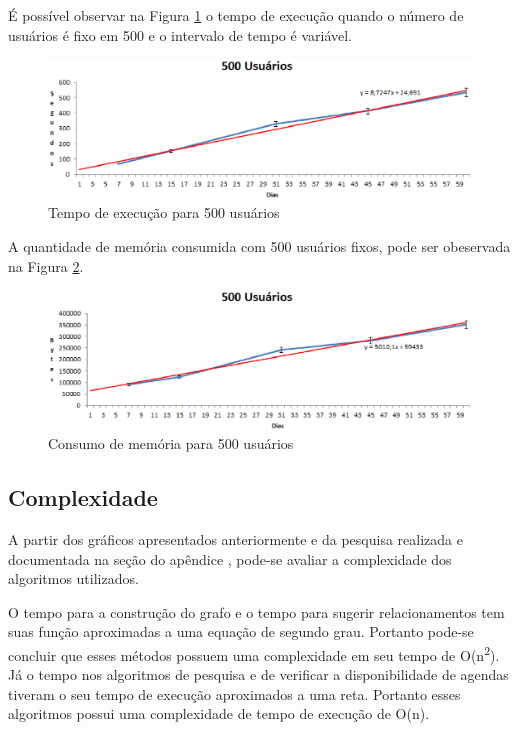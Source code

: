 
É possível observar na Figura \ref{500users_tempo} o tempo de execução quando o número de usuários é fixo em 500 e o intervalo de tempo é variável.

\begin{figure}[!h]
	\centering
	\includegraphics[scale=0.8]{figuras/resultados/graficos/500_user_tempo.eps}
	\caption[Tempo de execução para 500 usuários]{Tempo de execução para 500 usuários}
	\label{500users_tempo}
\end{figure}


A quantidade de memória consumida com 500 usuários fixos, pode ser obeservada na Figura \ref{500users_memoria}.

\begin{figure}[!h]
	\centering
	\includegraphics[scale=0.8]{figuras/resultados/graficos/500_user_memo.eps}
	\caption[Consumo de memória para 500 usuários]{Consumo de memória para 500 usuários}
	\label{500users_memoria}
\end{figure}

\subsection{Complexidade}

A partir dos gráficos apresentados anteriormente e da pesquisa realizada e documentada na seção do apêndice , pode-se avaliar a complexidade dos algoritmos utilizados.

O tempo para a construção do grafo e o tempo para sugerir relacionamentos tem suas função aproximadas a uma equação de segundo grau. Portanto pode-se concluir que esses métodos possuem uma complexidade em seu tempo de O(n\textsuperscript{2}). Já o tempo nos algoritmos de pesquisa e de verificar a disponibilidade de agendas tiveram o seu tempo de execução aproximados a uma reta. Portanto esses algoritmos possui uma complexidade de tempo de execução de O(n).

